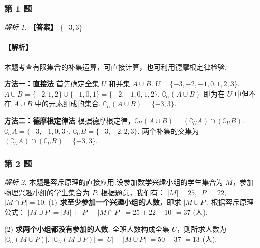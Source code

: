 \documentclass[12pt,a4paper]{ctexbook}
\theoremstyle{definition}
\theoremstyle{remark}
\newtheorem*{solution}{解析}
\begin{document}
	\subsubsection*{第 1 题}
	\begin{solution}
		\textbf{【答案】} $\{-3, 3\}$
		\paragraph{【解析】}
		本题考查有限集合的补集运算，可直接计算，也可利用德摩根定律检验.
		
		\textbf{方法一：直接法}
		首先确定全集 $U$ 和并集 $A \cup B$.
		$U = \{-3, -2, -1, 0, 1, 2, 3\}$.
		$A \cup B = \{-2, 1, 2\} \cup \{-1, 0, 1\} = \{-2, -1, 0, 1, 2\}$.
		$\complement_U(A \cup B)$ 即为在 $U$ 中但不在 $A \cup B$ 中的元素组成的集合.
		$\complement_U(A \cup B) = \{-3, 3\}$.
		
		\textbf{方法二：德摩根定律法}
		根据德摩根定律，$\complement_U(A \cup B) = (\complement_U A) \cap (\complement_U B)$.
		$\complement_U A = \{-3, -1, 0, 3\}$.
		$\complement_U B = \{-3, -2, 2, 3\}$.
		两个补集的交集为 $(\complement_U A) \cap (\complement_U B) = \{-3, 3\}$.
	\end{solution}
	
	\subsubsection*{第 2 题}
	\begin{solution}
		本题是容斥原理的直接应用.设参加数学兴趣小组的学生集合为 $M$，参加物理兴趣小组的学生集合为 $P$.
		根据题意，我们有：
		$|M| = 25$, $|P| = 22$, $|M \cap P| = 10$.
		(1) \textbf{求至少参加一个兴趣小组的人数}，即求 $|M \cup P|$.
		根据容斥原理公式：
		$|M \cup P| = |M| + |P| - |M \cap P|$
		$= 25 + 22 - 10$
		$= 37$ (人).
		
		(2) \textbf{求两个小组都没有参加的人数}.
		全班人数构成全集 $U$，则所求人数为 $|\complement_U(M \cup P)|$.
		$|\complement_U(M \cup P)| = |U| - |M \cup P|$
		$= 50 - 37$
		$= 13$ (人).
	\end{solution}
	
\end{document}
